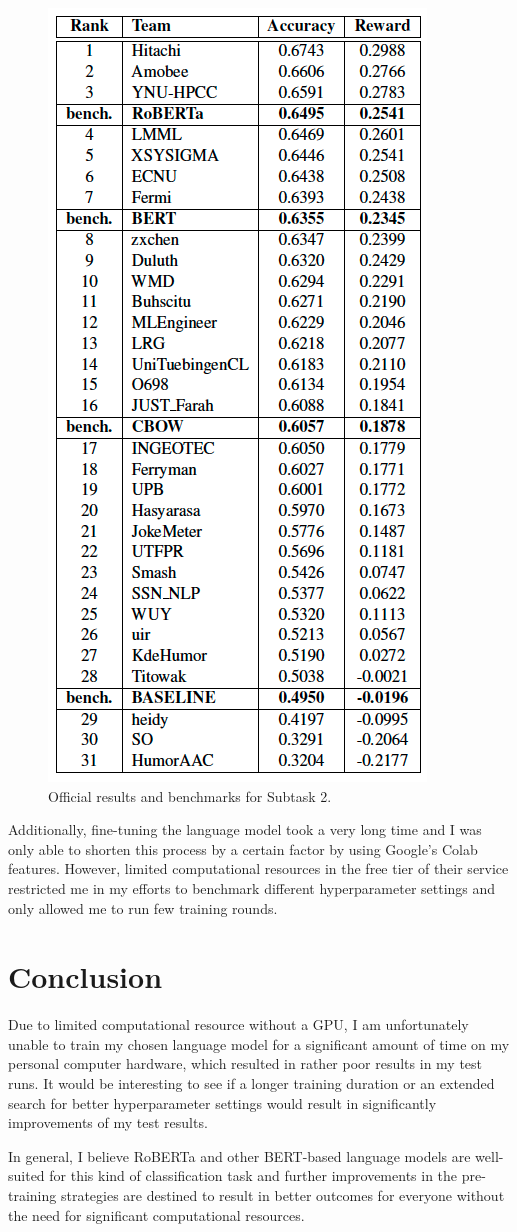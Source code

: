 \documentclass[11pt,a4paper,onecolumn,oneside,notitlepage]{article}
\begin{document}
    \begin{figure}
        \begin{center}
            \includegraphics[width=0.3\linewidth]{images/paper_benchmarks.png}
        \end{center}

        \caption{Official results and benchmarks for Subtask 2.}\label{fig2}
    \end{figure}

    Additionally, fine-tuning the language model took a very long time and I was only able to shorten this process by a certain factor by using Google's Colab features. However, limited computational resources in the free tier of their service restricted me in my efforts to benchmark different hyperparameter settings and only allowed me to run few training rounds.


    \section{Conclusion}
    Due to limited computational resource without a GPU, I am unfortunately unable to train my chosen language model for a significant amount of time on my personal computer hardware, which resulted in rather poor results in my test runs. It would be interesting to see if a longer training duration or an extended search for better hyperparameter settings would result in significantly improvements of my test results.

    In general, I believe RoBERTa and other BERT-based language models are well-suited for this kind of classification task and further improvements in the pre-training strategies are destined to result in better outcomes for everyone without the need for significant computational resources.

    \printbibliography
\end{document}
